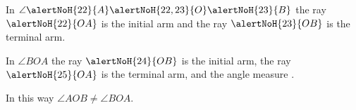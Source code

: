 \begin{frame}
\begin{columns}
\begin{itemize}
{\item<22-> In $\angle \alertNoH{22}{A}\alertNoH{22,23}{O}\alertNoH{23}{B}$ the ray $\alertNoH{22}{OA}$ is the initial arm and the ray  $\alertNoH{23}{OB}$ is the terminal arm.
\item<24-> In $\angle BOA$ the ray $\alertNoH{24}{OB}$ is the initial arm, the ray $\alertNoH{25}{OA}$ is the terminal arm, and the angle measure . 
\item<27->{In this way $\angle AOB\neq \angle BOA$.}

}

\end{itemize}


\end{columns}


\vskip 20cm

\end{frame}